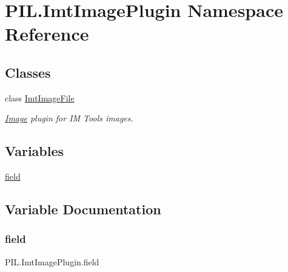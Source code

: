 \hypertarget{namespacePIL_1_1ImtImagePlugin}{}\section{P\+I\+L.\+Imt\+Image\+Plugin Namespace Reference}
\label{namespacePIL_1_1ImtImagePlugin}
\subsection*{Classes}
\begin{DoxyCompactItemize}
\item 
class \hyperlink{classPIL_1_1ImtImagePlugin_1_1ImtImageFile}{Imt\+Image\+File}
\begin{DoxyCompactList}\small\item\em \hyperlink{namespacePIL_1_1Image}{Image} plugin for IM Tools images. \end{DoxyCompactList}\end{DoxyCompactItemize}
\subsection*{Variables}
\begin{DoxyCompactItemize}
\item 
\hyperlink{namespacePIL_1_1ImtImagePlugin_a3ff61f350b899f32aa26cfe53c2342f1}{field}
\end{DoxyCompactItemize}


\subsection{Variable Documentation}
\mbox{\label{namespacePIL_1_1ImtImagePlugin_a3ff61f350b899f32aa26cfe53c2342f1}} 
\subsubsection{\texorpdfstring{field}{field}}
{\footnotesize\ttfamily P\+I\+L.\+Imt\+Image\+Plugin.\+field}

